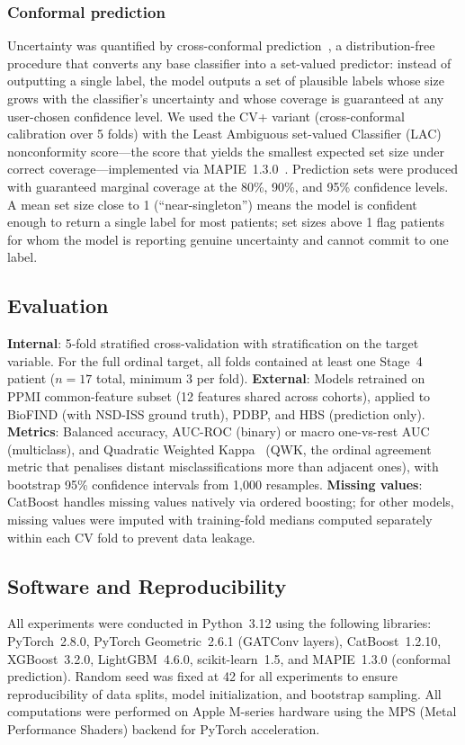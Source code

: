 \subsubsection{Conformal prediction}
Uncertainty was quantified by cross-conformal prediction~\cite{vovk2022,shafer2008,angelopoulos2021}, a distribution-free procedure that converts any base classifier into a set-valued predictor: instead of outputting a single label, the model outputs a set of plausible labels whose size grows with the classifier's uncertainty and whose coverage is guaranteed at any user-chosen confidence level. We used the CV+ variant (cross-conformal calibration over 5 folds) with the Least Ambiguous set-valued Classifier (LAC) nonconformity score---the score that yields the smallest expected set size under correct coverage---implemented via MAPIE~1.3.0~\cite{mapie2022}. Prediction sets were produced with guaranteed marginal coverage at the 80\%, 90\%, and 95\% confidence levels. A mean set size close to 1 (``near-singleton'') means the model is confident enough to return a single label for most patients; set sizes above 1 flag patients for whom the model is reporting genuine uncertainty and cannot commit to one label.

\subsection{Evaluation}
\textbf{Internal}: 5-fold stratified cross-validation with stratification on the target variable. For the full ordinal target, all folds contained at least one Stage~4 patient ($n{=}17$ total, minimum 3 per fold).
\textbf{External}: Models retrained on PPMI common-feature subset (12 features shared across cohorts), applied to BioFIND (with NSD-ISS ground truth), PDBP, and HBS (prediction only).
\textbf{Metrics}: Balanced accuracy, AUC-ROC (binary) or macro one-vs-rest AUC (multiclass), and Quadratic Weighted Kappa~\cite{cohen1968} (QWK, the ordinal agreement metric that penalises distant misclassifications more than adjacent ones), with bootstrap 95\% confidence intervals from 1{,}000 resamples.
\textbf{Missing values}: CatBoost handles missing values natively via ordered boosting; for other models, missing values were imputed with training-fold medians computed separately within each CV fold to prevent data leakage.

\subsection{Software and Reproducibility}
All experiments were conducted in Python~3.12 using the following libraries: PyTorch~2.8.0, PyTorch Geometric~2.6.1 (GATConv layers), CatBoost~1.2.10, XGBoost~3.2.0, LightGBM~4.6.0, scikit-learn~1.5, and MAPIE~1.3.0 (conformal prediction). Random seed was fixed at 42 for all experiments to ensure reproducibility of data splits, model initialization, and bootstrap sampling. All computations were performed on Apple M-series hardware using the MPS (Metal Performance Shaders) backend for PyTorch acceleration.

